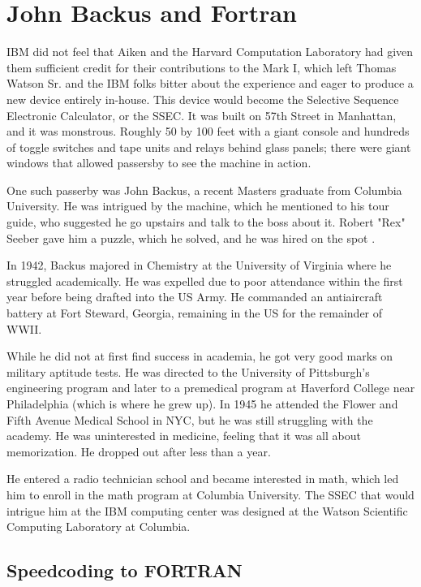 \section{John Backus and Fortran}

IBM did not feel that Aiken and the Harvard Computation Laboratory had given
them sufficient credit for their contributions to the Mark I, which left
Thomas Watson Sr. and the IBM folks bitter about the experience and eager to
produce a new device entirely in-house. This device would become the Selective
Sequence Electronic Calculator, or the SSEC. It was built on 57th Street in
Manhattan, and it was monstrous. Roughly 50 by 100 feet with a giant console
and hundreds of toggle switches and tape units and relays behind glass panels;
there were giant windows that allowed passersby to see the machine in action.

One such passerby was John Backus, a recent Masters graduate from Columbia
University. He was intrigued by the machine, which he mentioned to his tour
guide, who suggested he go upstairs and talk to the boss about it. Robert "Rex"
Seeber gave him a puzzle, which he solved, and he was hired on the spot
\cite{backus_oral_history_2006}.

In 1942, Backus majored in Chemistry at the University of Virginia where he
struggled academically. He was expelled due to poor attendance within the first
year before being drafted into the US Army. He commanded an antiaircraft
battery at Fort Steward, Georgia, remaining in the US for the remainder of
WWII.

While he did not at first find success in academia, he got very good marks on
military aptitude tests. He was directed to the University of Pittsburgh's
engineering program and later to a premedical program at Haverford College near
Philadelphia (which is where he grew up). In 1945 he attended the Flower and
Fifth Avenue Medical School in NYC, but he was still struggling with the
academy. He was uninterested in medicine, feeling that it was all about
memorization. He dropped out after less than a year.

He entered a radio technician school and became interested in math, which led
him to enroll in the math program at Columbia University. The SSEC that would
intrigue him at the IBM computing center was designed at the Watson Scientific
Computing Laboratory at Columbia.

\subsection{Speedcoding to FORTRAN}

